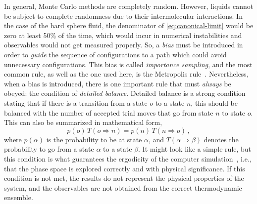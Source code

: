 In general, Monte Carlo methods are completely random. However, liquids cannot be
subject to complete randomness due to their intermolecular interactions. In the case
of the hard sphere fluid, the denominator of \autoref{eq:canonical-limit} would be zero
at least 50\% of the time, which would incur in numerical instabilities and observables
would not get measured properly. So, a \emph{bias} must be introduced in order to
\emph{guide} the sequence of configurations to a path which could avoid unnecessary
configurations. This bias is called \emph{importance sampling}, and the most common rule,
as well as the one used here, is the Metropolis rule~\cite{landauGuideMonteCarlo2021}.
Nevertheless, when a bias is introduced, there is one important rule that must
\emph{always} be obeyed: the condition of \emph{detailed balance}. Detailed balance
is a strong condition stating that if there is a transition from a state $o$ to a
state $n$, this should be balanced with the number of accepted trial moves that go
from state $n$ to state $o$. This can also be summarized in mathematical form,
\begin{equation}
    p(o) \, T(o \Longrightarrow n) = p(n) \, T(n \Longrightarrow o) \, ,
    \label{eq:detailed-balance}
\end{equation}
where $p(\alpha)$ is the probability to be at state $\alpha$, and 
$T(\alpha \Longrightarrow \beta)$ denotes the probability to go from a state 
$\alpha$ to a state $\beta$. It might look like a simple rule, but this condition
is what guarantees the ergodicity of the computer
simulation~\cite{landauGuideMonteCarlo2021}, i.e., that the phase space is explored
correctly and with physical significance. If this condition is not met, the results
do not represent the physical properties of the system, and the observables are not
obtained from the correct thermodynamic ensemble.

